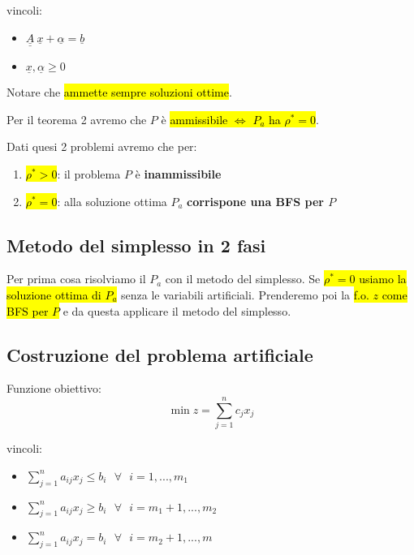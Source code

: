 vincoli:

\begin{itemize}
	\item $\underline{\underline{A}}\ \underline{x} + \underline{\alpha} = \underline{b}$
	\item $\underline{x}, \underline{\alpha} \geq 0$
\end{itemize}

Notare che \hl{ammette sempre soluzioni ottime}.

Per il teorema 2 avremo che $P$ è \hl{ammissibile $\Leftrightarrow$ $P_a$ ha $\rho^* = 0$}.

Dati quesi 2 problemi avremo che per:

\begin{enumerate}
	\item \hl{$\rho^* > 0$}: il problema $P$ è \textbf{inammissibile}
	\item \hl{$\rho^* = 0$}: alla soluzione ottima $P_a$ \textbf{corrispone una BFS per $P$}
\end{enumerate}


\subsection{Metodo del simplesso in 2 fasi}

Per prima cosa risolviamo il $P_a$ con il metodo del simplesso. Se \hl{$\rho^* = 0$ usiamo la soluzione ottima di $P_a$} senza le variabili artificiali. Prenderemo poi la \hl{f.o. $z$ come BFS per $P$} e da questa applicare il metodo del simplesso. 


\subsection{Costruzione del problema artificiale}

Funzione obiettivo:
$$\min z = \sum_{j = 1}^n c_jx_j$$

vincoli:

\begin{itemize}
	\item $\sum_{j=1}^n a_{ij}x_j \leq b_i\ \ \ \forall\ \ \ i = 1, ..., m_1$
	\item $\sum_{j=1}^n a_{ij}x_j \geq b_i\ \ \ \forall\ \ \ i = m_1+1, ..., m_2$
	\item $\sum_{j=1}^n a_{ij}x_j = b_i\ \ \ \forall\ \ \ i = m_2+1, ..., m$
\end{itemize}

